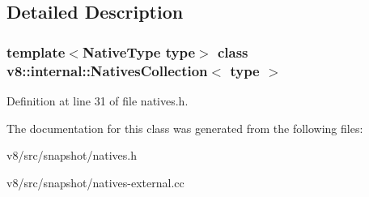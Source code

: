\subsection{Detailed Description}
\subsubsection*{template$<$Native\+Type type$>$\newline
class v8\+::internal\+::\+Natives\+Collection$<$ type $>$}



Definition at line 31 of file natives.\+h.



The documentation for this class was generated from the following files\+:\begin{DoxyCompactItemize}
\item 
v8/src/snapshot/natives.\+h\item 
v8/src/snapshot/natives-\/external.\+cc\end{DoxyCompactItemize}

